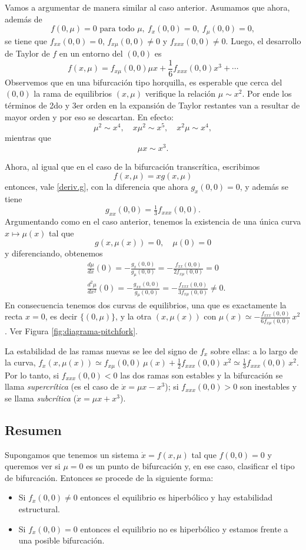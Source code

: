 \documentclass[12pt, a4paper]{amsbook}
\theoremstyle{remark}
\theoremstyle{definition}
\numberwithin{section}{chapter}
\numberwithin{subsection}{section}
\numberwithin{equation}{section}
\numberwithin{figure}{chapter}
\begin{document}
Vamos a argumentar de manera similar al caso anterior. Asumamos que ahora, además de
$$
f(0,\mu)=0 \text{ para todo } \mu,\ f_x(0,0)=0,\ f_\mu(0,0)=0,
$$
se tiene que $f_{xx}(0,0)=0$, $f_{x\mu}(0,0)\neq0$ y $f_{xxx}(0,0)\neq0$. Luego, el desarrollo de Taylor de $f$ en un entorno del $(0,0)$ es
$$
f(x, \mu) = f_{x\mu}(0,0)\mu x +  \frac{1}{6}f_{xxx}(0,0) x^3 + \cdots
$$
Observemos que en una bifurcación tipo horquilla, es esperable que cerca del $(0,0)$ la rama de equilibrios $(x,\mu)$ verifique la relación $\mu\sim x^2$. Por ende los términos de 2do y 3er orden en la expansión de Taylor restantes van a resultar de mayor orden y por eso se descartan. En efecto:
$$
\mu^2 \sim x^4,\quad x\mu^2\sim x^5,\quad x^2\mu\sim x^4,
$$
mientras que
$$
\mu x \sim x^3.
$$

Ahora, al igual que en el caso de la bifurcación transcrítica, escribimos
$$
f(x,\mu) = x g(x, \mu)
$$
entonces, vale \eqref{deriv.g}, con la diferencia que ahora $g_x(0,0) = 0$, y además se tiene
$$
g_{xx}(0,0) = \tfrac13 f_{xxx}(0,0).
$$
Argumentando como en el caso anterior, tenemos la existencia de una única curva $x\mapsto\mu(x)$ tal que
$$
g(x, \mu(x))=0,\quad \mu(0)=0
$$
y diferenciando, obtenemos
\begin{align*}
&\frac{d\mu}{dx}(0) = -\frac{g_x(0,0)}{g_\mu(0,0)} = -\frac{f_{xx}(0,0)}{2f_{x\mu}(0,0)} = 0\\
&\frac{d^2\mu}{dx^2}(0) = -\frac{g_{xx}(0,0)}{g_\mu(0,0)} = -\frac{f_{xxx}(0,0)}{3f_{x\mu}(0,0)} \neq 0.
\end{align*}
En consecuencia tenemos dos curvas de equilibrios, una que es exactamente la recta $x=0$, es decir $\{(0,\mu)\}$, y la otra $(x,\mu(x))$ con $\mu(x) \simeq -\frac{f_{xxx}(0,0)}{6f_{x\mu}(0,0)}\,x^2$. Ver Figura \ref{fig:diagrama-pitchfork}.

La estabilidad de las ramas nuevas se lee del signo de $f_x$ sobre ellas: a lo largo de la curva, $f_x(x,\mu(x)) \simeq f_{x\mu}(0,0)\,\mu(x) + \frac12 f_{xxx}(0,0)\,x^2 \simeq \frac13 f_{xxx}(0,0)\,x^2$. Por lo tanto, si $f_{xxx}(0,0)<0$ las dos ramas son estables y la bifurcación se llama \emph{supercrítica} (es el caso de $\dot x=\mu x-x^3$); si $f_{xxx}(0,0)>0$ son inestables y se llama \emph{subcrítica} ($\dot x=\mu x+x^3$).

\subsection{Resumen}

Supongamos que tenemos un sistema $\dot x = f(x, \mu)$ tal que $f(0,0)=0$ y queremos ver si $\mu=0$ es un punto de bifurcación y, en ese caso, clasificar el tipo de bifurcación. Entonces se procede de la siguiente forma:
\begin{itemize}
\item Si $f_x(0,0)\neq 0$ entonces el equilibrio es hiperbólico y hay estabilidad estructural.

\item Si $f_x(0,0)=0$ entonces el equilibrio no es hiperbólico y estamos frente a una posible bifurcación.
\end{itemize}
\end{document}
